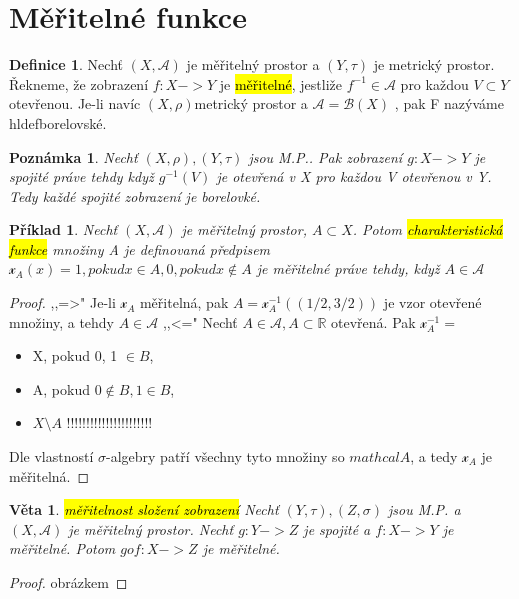 \documentclass{article}
\DeclareRobustCommand{\hldef}[1]{{\sethlcolor{SkyBlue}\hl{#1}}}
\DeclareRobustCommand{\hlveta}[1]{{\sethlcolor{Lavender}\hl{#1}}}
\newtheorem{veta}{Věta}[section]
\newtheorem*{pozn}{Poznámka}
\newtheorem*{pr}{Příklad}
\theoremstyle{definition}
\newtheorem*{definice}{Definice}
\begin{document}
\section{Měřitelné funkce}
\begin{definice}
    Nechť \((X, \mathcal{A})\) je měřitelný prostor a \((Y, \tau)\) je metrický prostor. 
    Řekneme, že zobrazení \(f: X -> Y\) je \hldef{měřitelné}, jestliže \(f^{-1} \in \mathcal{A}\) 
    pro každou \(V \subset Y\) otevřenou. Je-li navíc \((X, \rho)\)metrický prostor a \(\mathcal{A} = \mathcal{B}(X)\) 
    , pak F nazýváme hldef{borelovské}.
\end{definice}
\begin{pozn}
    Nechť \((X, \rho), (Y, \tau)\) jsou M.P.. Pak zobrazení \(g: X -> Y\) je spojité práve tehdy když 
    \(g^{-1}(V)\) je otevřená v X pro každou V otevřenou v Y.
    Tedy každé spojité zobrazení je borelovké.
\end{pozn}
\begin{pr}
Nechť \((X, \mathcal{A})\) je měřitelný prostor, \(A \subset X\). Potom \hldef{charakteristická funkce} 
množiny A je definovaná předpisem \(\mathcal{x}_A (x) = 1, pokud x \in A, 0, pokud x \notin A\) je 
měřitelné práve tehdy, když \(A \in \mathcal{A}\)
\end{pr}
\begin{proof}
    ,,=>" Je-li \(\mathcal{x}_A\) měřitelná, pak \(A = \mathcal{x}_A^{-1} ((1/2, 3/2))\) je vzor otevřené množiny, a 
    tehdy \(A \in \mathcal{A}\)
    ,,<=" Nechť \(A \in \mathcal{A}, A \subset \mathbb{R}\) otevřená. Pak 
    \(\mathcal{x}_A^{-1} = \)
    \begin{itemize}
        \item X, pokud 0, 1 \(\in B\),
        \item A, pokud \(0 \notin B, 1 \in B\),
        \item \(X \setminus A\)
        !!!!!!!!!!!!!!!!!!!!!!
    \end{itemize}
    Dle vlastností \(\sigma\)-algebry patří všechny tyto množiny so \(mathcal{A}\), a tedy \(\mathcal{x}_A\) je měřitelná.
\end{proof}
\begin{veta}
    \hlveta{měřitelnost složení zobrazení}
    Nechť \((Y, \tau), (Z, \sigma) \) jsou M.P. a \((X, \mathcal{A})\) je měřitelný prostor. 
    Nechť \(g: Y -> Z\) je spojité a \( f:X->Y \) je měřitelné. Potom \(gof: X -> Z\) je měřitelné.
\end{veta}
\begin{proof}
    obrázkem
\end{proof}
\end{document}
